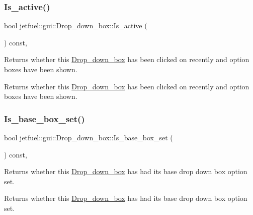 \subsubsection{\texorpdfstring{Is\+\_\+active()}{Is\_active()}}
{\footnotesize\ttfamily bool jetfuel\+::gui\+::\+Drop\+\_\+down\+\_\+box\+::\+Is\+\_\+active (\begin{DoxyParamCaption}{ }\end{DoxyParamCaption}) const\hspace{0.3cm}{\ttfamily [inline]}, {\ttfamily [protected]}}



Returns whether this \hyperlink{classjetfuel_1_1gui_1_1Drop__down__box}{Drop\+\_\+down\+\_\+box} has been clicked on recently and option boxes have been shown. 

Returns whether this \hyperlink{classjetfuel_1_1gui_1_1Drop__down__box}{Drop\+\_\+down\+\_\+box} has been clicked on recently and option boxes have been shown. \mbox{\label{classjetfuel_1_1gui_1_1Drop__down__box_aae9fb50bc6ad4ac4b8cf5570570d6f95}} 
\subsubsection{\texorpdfstring{Is\+\_\+base\+\_\+box\+\_\+set()}{Is\_base\_box\_set()}}
{\footnotesize\ttfamily bool jetfuel\+::gui\+::\+Drop\+\_\+down\+\_\+box\+::\+Is\+\_\+base\+\_\+box\+\_\+set (\begin{DoxyParamCaption}{ }\end{DoxyParamCaption}) const\hspace{0.3cm}{\ttfamily [inline]}, {\ttfamily [protected]}}



Returns whether this \hyperlink{classjetfuel_1_1gui_1_1Drop__down__box}{Drop\+\_\+down\+\_\+box} has had it\textquotesingle{}s base drop down box option set. 

Returns whether this \hyperlink{classjetfuel_1_1gui_1_1Drop__down__box}{Drop\+\_\+down\+\_\+box} has had it\textquotesingle{}s base drop down box option set. \mbox{\label{classjetfuel_1_1gui_1_1Drop__down__box_a66969f93183947614501055bc9e73510}} 
